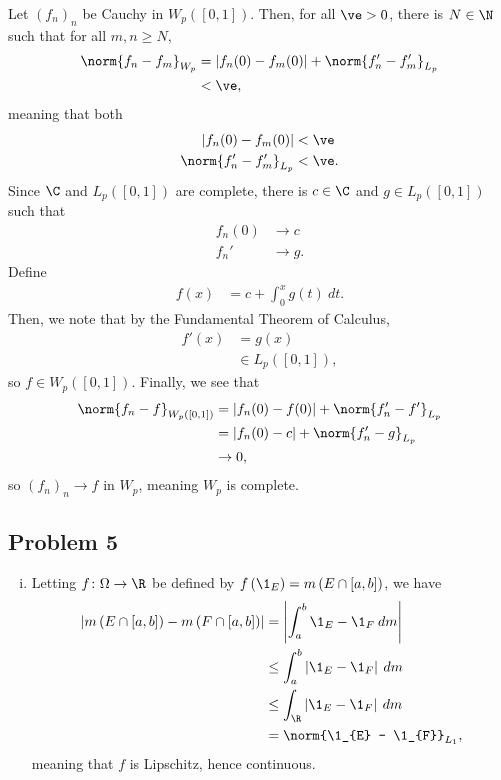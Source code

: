 \documentclass[10pt]{mypackage}
\begin{document}
Let $\left( f_n \right)_n$ be Cauchy in $W_p\left( [0,1] \right)$. Then, for all $\ve > 0$, there is $N\in \N$ such that for all $m,n\geq N$,
\begin{align*}
  \norm{f_n-f_m}_{W_p} &= \left\vert f_n(0)-f_m(0) \right\vert + \norm{f_n' - f_m'}_{L_p}\\
                       &< \ve,
\end{align*}
meaning that both
\begin{align*}
  \left\vert f_n(0)-f_m(0) \right\vert &< \ve\\
  \norm{f_n'-f_m'}_{L_p} &<\ve.
\end{align*}
Since $\C$ and $L_p\left( [0,1] \right)$ are complete, there is $c\in \C$ and $g\in L_p\left( [0,1] \right)$ such that
\begin{align*}
  f_n(0) &\rightarrow c\\
  f_n' &\rightarrow g.
\end{align*}
Define
\begin{align*}
  f(x) &= c + \int_{0}^{x} g(t)\:dt.
\end{align*}
Then, we note that by the Fundamental Theorem of Calculus,
\begin{align*}
  f'(x) &= g(x)\\
        &\in L_p\left( [0,1] \right),
\end{align*}
so $f\in W_p\left( [0,1] \right)$. Finally, we see that
\begin{align*}
  \norm{f_n-f}_{W_p\left( [0,1] \right)} &= \left\vert f_n(0) - f(0) \right\vert + \norm{f_n' - f'}_{L_p}\\
                                         &= \left\vert f_n(0) - c \right\vert + \norm{f_n'-g}_{L_p}\\
                                         &\rightarrow 0,
\end{align*}
so $\left( f_n \right)_n\rightarrow f$ in $W_p$, meaning $W_p$ is complete.
\subsection{Problem 5}%
\begin{enumerate}[(i)]
  \item Letting $f\colon \Omega\rightarrow \R$ be defined by $f\left( \1_E \right) = m\left( E\cap [a,b] \right)$, we have
    \begin{align*}
      \left\vert m\left( E\cap [a,b] \right) - m\left( F\cap [a,b] \right) \right\vert &= \left\vert \int_{a}^{b} \1_{E} - \1_{F}\:dm \right\vert\\
                                                                                       &\leq \int_{a}^{b} \left\vert \1_{E} - \1_{F} \right\vert\:dm\\
                                                                                       &\leq \int_{\R}^{} \left\vert \1_{E} - \1_{F} \right\vert\:dm\\
                                                                                       &= \norm{\1_{E} - \1_{F}}_{L_1},
    \end{align*}
    meaning that $f$ is Lipschitz, hence continuous.
\end{enumerate}
\end{document}

